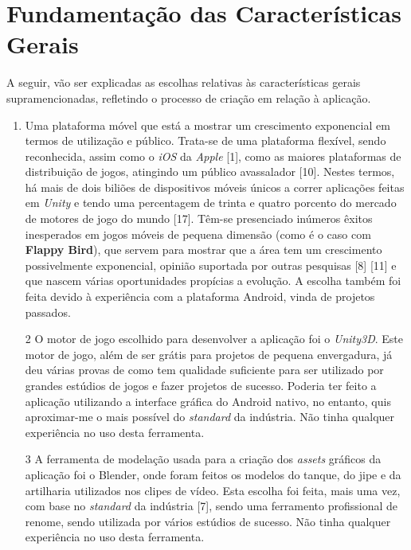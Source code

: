 \section{Fundamentação das Características Gerais}
\label{chap2:sec:DEL}
A seguir, vão ser explicadas as escolhas relativas às  características gerais supramencionadas, refletindo o  processo de criação em relação à aplicação.
\begin{enumerate}
\item Uma plataforma móvel que está a mostrar um crescimento exponencial em termos de utilização e público. Trata-se de uma plataforma flexível, sendo reconhecida, assim como o \emph{iOS} da \textit{Apple} [1], como as maiores plataformas de distribuição de jogos, atingindo um público avassalador [10]. Nestes termos, há mais de dois biliões de dispositivos móveis únicos a correr aplicações feitas em \emph{Unity} e tendo uma percentagem de trinta e quatro porcento do mercado de motores de jogo do mundo [17]. Têm-se presenciado inúmeros êxitos inesperados em jogos móveis de pequena dimensão (como é o caso com \textbf{Flappy Bird}), que servem para mostrar que a área tem um crescimento possivelmente exponencial, opinião suportada por outras pesquisas [8] [11] e que nascem várias oportunidades propícias a evolução. A escolha também foi feita devido à experiência  com a plataforma Android, vinda de projetos passados.

\item[2]  O motor de jogo escolhido para desenvolver a aplicação foi o \emph{Unity3D}. Este motor de jogo, além de ser grátis para projetos de pequena envergadura, já deu várias provas de como tem qualidade suficiente para ser utilizado por grandes estúdios de jogos e fazer projetos de sucesso. Poderia ter feito a aplicação utilizando a interface gráfica do Android nativo, no entanto, quis aproximar-me o mais possível do \textit{standard} da indústria. Não tinha qualquer experiência no uso desta ferramenta.

\item[3] A ferramenta de modelação usada para a criação dos \textit{assets} gráficos da aplicação foi o Blender, onde foram feitos os modelos do tanque, do jipe e da artilharia utilizados nos clipes de vídeo. Esta escolha foi feita, mais uma vez, com base no \textit{standard} da indústria [7], sendo uma ferramento profissional de renome, sendo utilizada por vários estúdios de sucesso. Não tinha qualquer experiência no uso desta ferramenta.


\end{enumerate}
